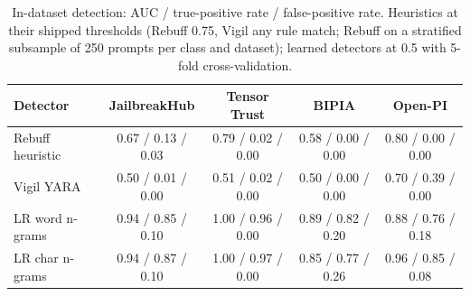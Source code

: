 \begin{table}[t]
\centering
\caption{In-dataset detection: AUC / true-positive rate / false-positive rate. Heuristics at their shipped thresholds (Rebuff 0.75, Vigil any rule match; Rebuff on a stratified subsample of 250 prompts per class and dataset); learned detectors at 0.5 with 5-fold cross-validation.}
\label{tab:in}
\footnotesize
\setlength{\tabcolsep}{3pt}
\begin{tabular}{lcccc}
\toprule
Detector & JailbreakHub & Tensor Trust & BIPIA & Open-PI \\
\midrule
Rebuff heuristic & 0.67 / 0.13 / 0.03 & 0.79 / 0.02 / 0.00 & 0.58 / 0.00 / 0.00 & 0.80 / 0.00 / 0.00 \\
Vigil YARA & 0.50 / 0.01 / 0.00 & 0.51 / 0.02 / 0.00 & 0.50 / 0.00 / 0.00 & 0.70 / 0.39 / 0.00 \\
LR word n-grams & 0.94 / 0.85 / 0.10 & 1.00 / 0.96 / 0.00 & 0.89 / 0.82 / 0.20 & 0.88 / 0.76 / 0.18 \\
LR char n-grams & 0.94 / 0.87 / 0.10 & 1.00 / 0.97 / 0.00 & 0.85 / 0.77 / 0.26 & 0.96 / 0.85 / 0.08 \\
\bottomrule
\end{tabular}
\end{table}
